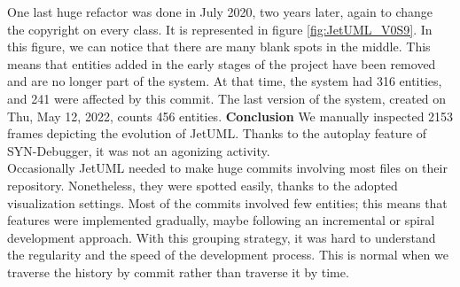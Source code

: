 One last huge refactor was done in July 2020, two years later, again to change the copyright on every class. It is represented in figure \ref{fig:JetUML_V0S9}. In this figure, we can notice that there are many blank spots in the middle. This means that entities added in the early stages of the project have been removed and are no longer part of the system. At that time, the system had 316 entities, and 241 were affected by this commit. 
\bigbreak
The last version of the system, created on Thu, May 12, 2022, counts 456 entities. 
\bigbreak
\textbf{Conclusion}
We manually inspected 2153 frames depicting the evolution of JetUML.
Thanks to the autoplay feature of SYN-Debugger, it was not an agonizing activity. \\
Occasionally JetUML needed to make huge commits involving most files on their repository. Nonetheless, they were spotted easily, thanks to the adopted visualization settings. 
Most of the commits involved few entities; this means that features were implemented gradually, maybe following an incremental or spiral development approach. 
With this grouping strategy, it was hard to understand the regularity and the speed of the development process. This is normal when we traverse the history by commit rather than traverse it by time. 

